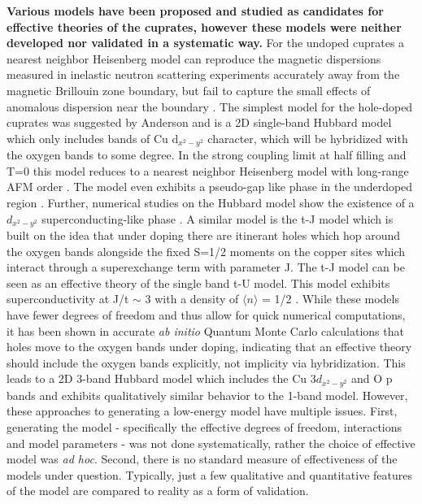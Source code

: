 \documentclass{article}
\begin{document}
\textbf{Various models have been proposed and studied as candidates for effective theories of the cuprates, however these models were neither developed nor validated in a systematic way.}
For the undoped cuprates a nearest neighbor Heisenberg model can reproduce the magnetic dispersions measured in inelastic neutron scattering experiments accurately away from the magnetic Brillouin zone boundary, but fail to capture the small effects of anomalous dispersion near the boundary \cite{PhysRevB.79.155114, PhysRevLett.75.553}. 
The simplest model for the hole-doped cuprates was suggested by Anderson and is a 2D single-band Hubbard model which only includes bands of Cu d$_{x^2-y^2}$ character, which will be hybridized with the oxygen bands to some degree. 
In the strong coupling limit at half filling and T=0 this model reduces to a nearest neighbor Heisenberg model with long-range AFM order \cite{doi:10.1139/p78-120, PhysRevB.38.316}.
The model even exhibits a pseudo-gap like phase in the underdoped region \cite{PhysRevLett.94.156404,PhysRevB.74.024508}. 
Further, numerical studies on the Hubbard model show the existence of a $d_{x^2-y^2}$ superconducting-like phase \cite{PhysRevB.81.224505, PhysRevB.70.054504}. 
A similar model is the t-J model  which is built on the idea that under doping there are itinerant holes which hop around the oxygen bands alongside the fixed S=1/2 moments on the copper sites which interact through a superexchange term with parameter J. 
The t-J model can be seen as an effective theory of the single band t-U model. 
This model exhibits superconductivity at J/t $\sim$ 3 with a density of $\langle n \rangle$ = 1/2 \cite{PhysRevB.45.5744, PhysRevLett.70.682}.
While these models have fewer degrees of freedom and thus allow for quick numerical computations, it has been shown in accurate \textit{ab initio} Quantum Monte Carlo calculations that holes move to the oxygen bands under doping, indicating that an effective theory should include the oxygen bands explicitly, not implicity via hybridization. 
This leads to a 2D 3-band Hubbard model which includes the Cu 3$d_{x^2-y^2}$ and O p bands \cite{PhysRevLett.58.2794, VARMA1987681} and exhibits qualitatively similar behavior to the 1-band model. 
However, these approaches to generating a low-energy model have multiple issues.
First, generating the model - specifically the effective degrees of freedom, interactions and model parameters - was not done systematically, rather the choice of effective model was \textit{ad hoc}.
Second, there is no standard measure of effectiveness of the models under question. 
Typically, just a few qualitative and quantitative features of the model are compared to reality as a form of validation.
\end{document}
